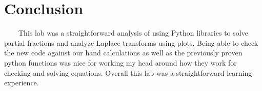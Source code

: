 \documentclass[11pt,a4]{article}
\begin{document}
\section{Conclusion}
\ \ \ \ This lab was a straightforward analysis of using Python libraries to solve partial fractions and analyze Laplace transforms using plots. Being able to check the new code against our hand calculations as well as the previously proven python functions was nice for working my head around how they work for checking and solving equations. Overall this lab was a straightforward learning experience.
\end{document}
